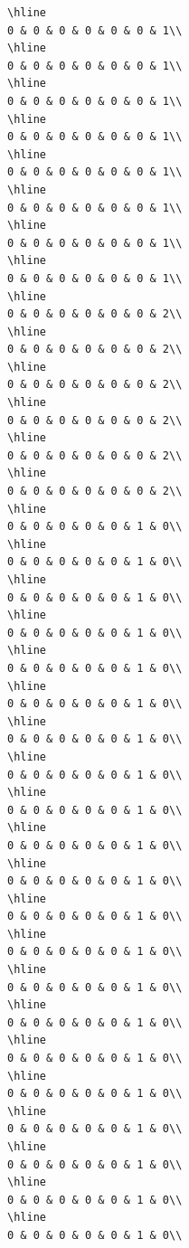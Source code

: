 \documentclass[
]{article}
\begin{document}
\begin{verbatim}
\hline
0 & 0 & 0 & 0 & 0 & 0 & 1\\
\hline
0 & 0 & 0 & 0 & 0 & 0 & 1\\
\hline
0 & 0 & 0 & 0 & 0 & 0 & 1\\
\hline
0 & 0 & 0 & 0 & 0 & 0 & 1\\
\hline
0 & 0 & 0 & 0 & 0 & 0 & 1\\
\hline
0 & 0 & 0 & 0 & 0 & 0 & 1\\
\hline
0 & 0 & 0 & 0 & 0 & 0 & 1\\
\hline
0 & 0 & 0 & 0 & 0 & 0 & 1\\
\hline
0 & 0 & 0 & 0 & 0 & 0 & 2\\
\hline
0 & 0 & 0 & 0 & 0 & 0 & 2\\
\hline
0 & 0 & 0 & 0 & 0 & 0 & 2\\
\hline
0 & 0 & 0 & 0 & 0 & 0 & 2\\
\hline
0 & 0 & 0 & 0 & 0 & 0 & 2\\
\hline
0 & 0 & 0 & 0 & 0 & 0 & 2\\
\hline
0 & 0 & 0 & 0 & 0 & 1 & 0\\
\hline
0 & 0 & 0 & 0 & 0 & 1 & 0\\
\hline
0 & 0 & 0 & 0 & 0 & 1 & 0\\
\hline
0 & 0 & 0 & 0 & 0 & 1 & 0\\
\hline
0 & 0 & 0 & 0 & 0 & 1 & 0\\
\hline
0 & 0 & 0 & 0 & 0 & 1 & 0\\
\hline
0 & 0 & 0 & 0 & 0 & 1 & 0\\
\hline
0 & 0 & 0 & 0 & 0 & 1 & 0\\
\hline
0 & 0 & 0 & 0 & 0 & 1 & 0\\
\hline
0 & 0 & 0 & 0 & 0 & 1 & 0\\
\hline
0 & 0 & 0 & 0 & 0 & 1 & 0\\
\hline
0 & 0 & 0 & 0 & 0 & 1 & 0\\
\hline
0 & 0 & 0 & 0 & 0 & 1 & 0\\
\hline
0 & 0 & 0 & 0 & 0 & 1 & 0\\
\hline
0 & 0 & 0 & 0 & 0 & 1 & 0\\
\hline
0 & 0 & 0 & 0 & 0 & 1 & 0\\
\hline
0 & 0 & 0 & 0 & 0 & 1 & 0\\
\hline
0 & 0 & 0 & 0 & 0 & 1 & 0\\
\hline
0 & 0 & 0 & 0 & 0 & 1 & 0\\
\hline
0 & 0 & 0 & 0 & 0 & 1 & 0\\
\hline
0 & 0 & 0 & 0 & 0 & 1 & 0\\

\end{verbatim}
\end{document}
